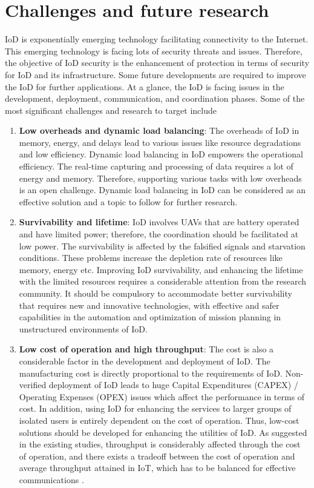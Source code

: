 \documentclass{easychair}
\begin{document}
\section{Challenges and future research}
\label{sect:IoD_Challenges}
IoD is exponentially emerging technology facilitating connectivity to the Internet.  This emerging technology is facing lots of security threats and issues. Therefore, the objective of IoD security is the enhancement of protection in terms of security for IoD and its infrastructure. Some future developments are required to improve the IoD for further applications. At a glance, the IoD is facing issues in the development, deployment, communication, and coordination phases. Some of the most significant challenges and research to target include \begin{enumerate}
\item  \textbf{Low overheads and dynamic load balancing}: The overheads of IoD in memory, energy, and delays lead to various issues like resource degradations and low efficiency. Dynamic load balancing in IoD empowers the operational efficiency. The real-time capturing and processing of data requires a lot of energy and memory. Therefore, supporting various tasks with low overheads is an open challenge. Dynamic load balancing in IoD can be considered as an effective solution and a topic to follow for further research.
\item \textbf{Survivability and lifetime}: IoD involves UAVs that are battery operated and have limited power; therefore, the coordination should be facilitated at low power. The survivability is affected by the falsified signals and starvation conditions. These problems increase the depletion rate of resources like memory, energy etc. Improving IoD survivability, and enhancing the lifetime with the limited resources requires a considerable attention from the research community\cite{sharma2018secure}\cite{long2018energy}. It should be compulsory to accommodate better survivability that requires new and innovative technologies, with effective and safer capabilities in the automation and optimization of mission planning in unstructured environments of IoD.


\item \textbf{Low cost of operation and high throughput}: The cost is also a considerable factor in the development and deployment of IoD. The manufacturing cost is directly proportional to the requirements of IoD. Non-verified deployment of IoD leads to huge Capital Expenditures (CAPEX) / Operating Expenses (OPEX) issues which affect the performance in terms of cost. In addition, using IoD for enhancing the services to larger groups of isolated users is entirely dependent on the cost of operation. Thus, low-cost solutions should be developed for enhancing the utilities of IoD. As suggested in the existing studies, throughput is considerably affected through the cost of operation, and there exists a tradeoff between the cost of operation and average throughput attained in IoT, which has to be balanced for effective communications \cite{sharma2017quat}.


\end{enumerate}
\end{document}
